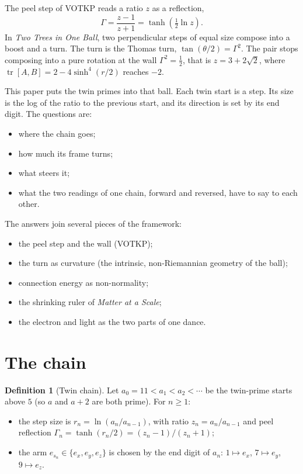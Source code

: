\documentclass[11pt]{article}
\theoremstyle{definition}
\newtheorem{definition}{Definition}
\theoremstyle{remark}
\begin{document}
The peel step of VOTKP reads a ratio $z$ as a reflection,
\[
\Gamma=\frac{z-1}{z+1}=\tanh\!\left(\tfrac12\ln z\right).
\]
In \emph{Two Trees in One Ball}, two perpendicular steps of equal size compose into a boost and a turn. The turn is the Thomas turn, $\tan(\theta/2)=\Gamma^2$. The pair stops composing into a pure rotation at the wall $\Gamma^2=\tfrac12$, that is $z=3+2\sqrt2$, where $\operatorname{tr}[A,B]=2-4\sinh^4(r/2)$ reaches $-2$.

This paper puts the twin primes into that ball. Each twin start is a step. Its size is the log of the ratio to the previous start, and its direction is set by its end digit. The questions are:
\begin{itemize}
\item where the chain goes;
\item how much its frame turns;
\item what steers it;
\item what the two readings of one chain, forward and reversed, have to say to each other.
\end{itemize}

The answers join several pieces of the framework:
\begin{itemize}
\item the peel step and the wall (VOTKP);
\item the turn as curvature (the intrinsic, non-Riemannian geometry of the ball);
\item connection energy as non-normality;
\item the shrinking ruler of \emph{Matter at a Scale};
\item the electron and light as the two parts of one dance.
\end{itemize}

\section{The chain}

\begin{definition}[Twin chain]
Let $a_0=11<a_1<a_2<\cdots$ be the twin-prime starts above $5$ (so $a$ and $a+2$ are both prime). For $n\ge1$:
\begin{itemize}
\item the step size is $r_n=\ln(a_n/a_{n-1})$, with ratio $z_n=a_n/a_{n-1}$ and peel reflection $\Gamma_n=\tanh(r_n/2)=(z_n-1)/(z_n+1)$;
\item the arm $e_{s_n}\in\{e_x,e_y,e_z\}$ is chosen by the end digit of $a_n$: $1\mapsto e_x$, $7\mapsto e_y$, $9\mapsto e_z$.
\end{itemize}
\end{definition}
\end{document}
